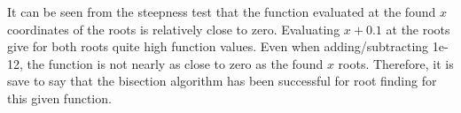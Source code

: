 
It can be seen from the steepness test that the function evaluated at the found $x$ coordinates of the roots is relatively close to zero. Evaluating $x + 0.1$ at the roots give for both roots quite high function values. Even when adding/subtracting 1e-12, the function is not nearly as close to zero as the found $x$ roots. Therefore, it is save to say that the bisection algorithm has been successful for root finding  for this given function.